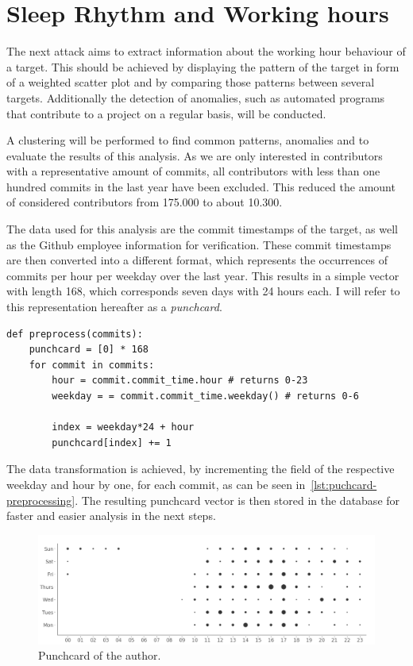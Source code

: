 \section{Sleep Rhythm and Working hours}

The next attack aims to extract information about the working hour behaviour of a target.
This should be achieved by displaying the pattern of the target in form of a weighted scatter plot and by comparing those patterns between several targets.
Additionally the detection of anomalies, such as automated programs that contribute to a project on a regular basis, will be conducted.

A clustering will be performed to find common patterns, anomalies and to evaluate the results of this analysis.
As we are only interested in contributors with a representative amount of commits, all contributors with less than one hundred commits in the last year have been excluded.
This reduced the amount of considered contributors from 175.000 to about 10.300.

The data used for this analysis are the commit timestamps of the target, as well as the Github employee information for verification.
These commit timestamps are then converted into a different format, which represents the occurrences of commits per hour per weekday over the last year.
This results in a simple vector with length 168, which corresponds seven days with 24 hours each.
I will refer to this representation hereafter as a \emph{punchcard}.

\begin{verbatim}
def preprocess(commits):
    punchcard = [0] * 168
    for commit in commits:
        hour = commit.commit_time.hour # returns 0-23
        weekday = = commit.commit_time.weekday() # returns 0-6

        index = weekday*24 + hour
        punchcard[index] += 1

\end{verbatim}
\begingroup
{}\label{lst:puchcard-preprocessing}
\endgroup

The data transformation is achieved, by incrementing the field of the respective weekday and hour by one, for each commit, as can be seen in~\ref{lst:puchcard-preprocessing}.
The resulting punchcard vector is then stored in the database for faster and easier analysis in the next steps.

\begin{figure}[H]
    \includegraphics[scale=0.32]{./graphs/analysis/ordered-punchcard}
    \centering
    \caption{Punchcard of the author.}\label{fig:working-hour-rhythm-author}
\end{figure}


